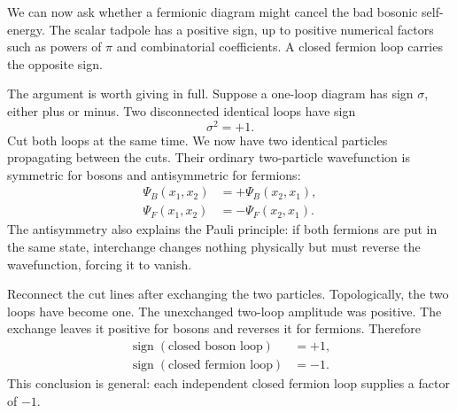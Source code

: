 We can now ask whether a fermionic diagram might cancel the bad bosonic self-energy. The scalar tadpole has a positive sign, up to positive numerical factors such as powers of \(\pi\) and combinatorial coefficients. A closed fermion loop carries the opposite sign.

\begin{classroomqa}
\end{classroomqa}

The argument is worth giving in full. Suppose a one-loop diagram has sign \(\sigma\), either plus or minus. Two disconnected identical loops have sign
\begin{equation}
\sigma^2=+1.
\end{equation}
Cut both loops at the same time. We now have two identical particles propagating between the cuts. Their ordinary two-particle wavefunction is symmetric for bosons and antisymmetric for fermions:
\begin{align}
\Psi_B(x_1,x_2)&=+\Psi_B(x_2,x_1),\\
\Psi_F(x_1,x_2)&=-\Psi_F(x_2,x_1).
\end{align}
The antisymmetry also explains the Pauli principle: if both fermions are put in the same state, interchange changes nothing physically but must reverse the wavefunction, forcing it to vanish.

Reconnect the cut lines after exchanging the two particles. Topologically, the two loops have become one. The unexchanged two-loop amplitude was positive. The exchange leaves it positive for bosons and reverses it for fermions. Therefore
\begin{equation}
\begin{aligned}
\operatorname{sign}(\text{closed boson loop})&=+1,\\
\operatorname{sign}(\text{closed fermion loop})&=-1.
\end{aligned}
\end{equation}
This conclusion is general: each independent closed fermion loop supplies a factor of \(-1\).

